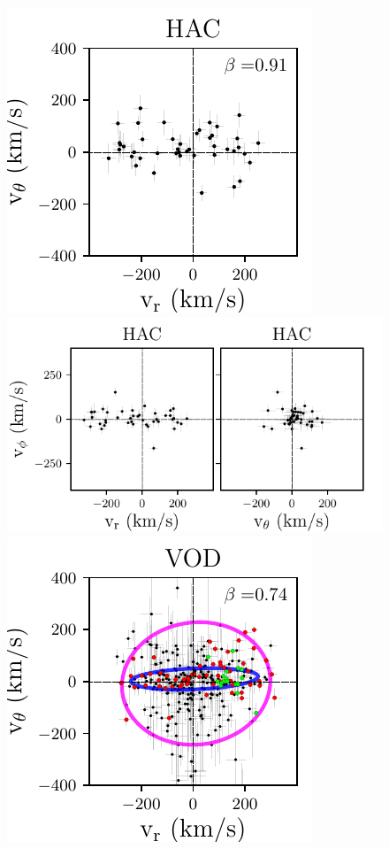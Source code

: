 \documentclass[fleqn,usenatbib]{mnras}
\begin{document}
\begin{figure}
	\includegraphics[scale=0.545]{HAC_velocities_vphi.pdf}
	\hspace{-0.25cm}
    \includegraphics[scale=0.545]{HAC_velocities_vtheta.pdf} \\
  \includegraphics[scale=0.545]{VOD_velocities_vphi.pdf}

\end{figure}
\end{document}
